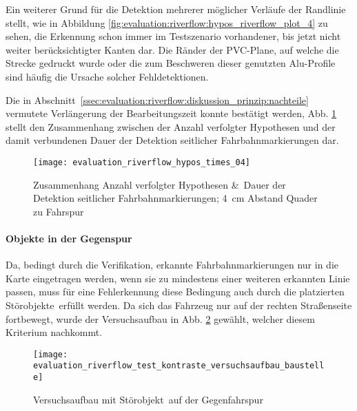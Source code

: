 Ein weiterer Grund für die Detektion mehrerer möglicher Verläufe der Randlinie stellt, wie in Abbildung \ref{fig:evaluation:riverflow:hypos_riverflow_plot_4} zu sehen, die Erkennung schon immer im Testszenario vorhandener, bis jetzt nicht weiter berücksichtigter Kanten dar. Die Ränder der PVC-Plane, auf welche die Strecke gedruckt wurde oder die zum Beschweren dieser genutzten Alu-Profile sind häufig die Ursache solcher Fehldetektionen.

Die in Abschnitt~\ref{ssec:evaluation:riverflow:diskussion_prinzip:nachteile} vermutete Verlängerung der Bearbeitungszeit konnte bestätigt werden, Abb. \ref{evaluation:riverflow:hypos:times_04} stellt den Zusammenhang zwischen der Anzahl verfolgter Hypothesen und der damit verbundenen Dauer der Detektion seitlicher Fahrbahnmarkierungen dar.

\begin{figure}[htbp] %
\centering
\texttt{[image: evaluation\_riverflow\_hypos\_times\_04]}
\caption{Zusammenhang Anzahl verfolgter Hypothesen \&\ Dauer der Detektion seitlicher Fahrbahnmarkierungen; \SI{4}{cm} Abstand Quader zu Fahrspur}
\label{evaluation:riverflow:hypos:times_04}
\end{figure}

\paragraph{Objekte in der Gegenspur}
Da, bedingt durch die Verifikation, erkannte Fahrbahnmarkierungen nur in die Karte eingetragen werden, wenn sie zu mindestens einer weiteren erkannten Linie passen, muss für eine Fehlerkennung diese Bedingung auch durch die platzierten \glqq Störobjekte\grqq\ erfüllt werden. Da sich das Fahrzeug nur auf der rechten Straßenseite fortbewegt, wurde der Versuchsaufbau in Abb. \ref{fig:evaluation:riverflow:test_kontraste_versuchsaufbau_baustelle} gewählt, welcher diesem Kriterium nachkommt.
\begin{figure}[htbp] %
\centering
\texttt{[image: evaluation\_riverflow\_test\_kontraste\_versuchsaufbau\_baustelle]}
\caption{Versuchsaufbau mit \glqq Störobjekt\grqq\ auf der Gegenfahrspur}
\label{fig:evaluation:riverflow:test_kontraste_versuchsaufbau_baustelle}
\end{figure}

